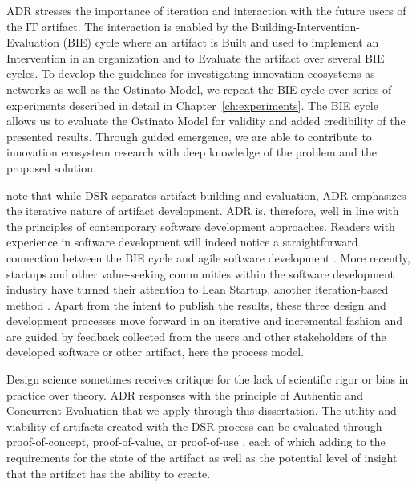 ADR stresses the importance of iteration and interaction with the future users of the IT artifact. The interaction is enabled by the Building-Intervention-Evaluation (BIE) cycle where an artifact is Built and used to implement an Intervention in an organization and to Evaluate the artifact over several BIE cycles. To develop the guidelines for investigating innovation ecosystems as networks as well as the Ostinato Model, we repeat the BIE cycle over series of experiments described in detail in Chapter~\ref{ch:experiments}. The BIE cycle allows us to evaluate the Ostinato Model for validity and added credibility of the presented results. Through guided emergence, we are able to contribute to innovation ecosystem research with deep knowledge of the problem and the proposed solution.

\cite{Sein2011ActionResearch} note that while DSR separates artifact building and evaluation, ADR emphasizes the iterative nature of artifact development. ADR is, therefore, well in line with the principles of contemporary software development approaches. Readers with experience in software development will indeed notice a straightforward connection between the BIE cycle and agile software development \citep[see e.g.][]{Schwaber2001}. More recently, startups and other value-seeking communities within the software development industry have turned their attention to Lean Startup, another iteration-based method \citep{Ries2011}. Apart from the intent to publish the results, these three design and development processes move forward in an iterative and incremental fashion and are guided by feedback collected from the users and other stakeholders of the developed software or other artifact, here the process model.

Design science sometimes receives critique for the lack of scientific rigor or bias in practice over theory. ADR responses with the principle of Authentic and Concurrent Evaluation \citep{Sein2011ActionResearch} that we apply through this dissertation. 
The utility and viability of artifacts created with the DSR process can be evaluated through proof-of-concept, proof-of-value, or proof-of-use \citep{Nunamaker2011TowardSystems}, each of which adding to the requirements for the state of the artifact as well as the potential level of insight that the artifact has the ability to create.  

